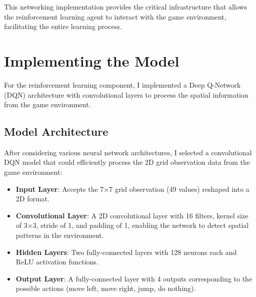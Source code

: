 This networking implementation provides the critical infrastructure that allows the reinforcement learning agent to interact with the game environment, facilitating the entire learning process.

\section{Implementing the Model}

For the reinforcement learning component, I implemented a Deep Q-Network (DQN) architecture with convolutional layers to process the spatial information from the game environment.

\subsection{Model Architecture}

After considering various neural network architectures, I selected a convolutional DQN model that could efficiently process the 2D grid observation data from the game environment:

\begin{itemize}
    \item \textbf{Input Layer}: Accepts the 7×7 grid observation (49 values) reshaped into a 2D format.
    \item \textbf{Convolutional Layer}: A 2D convolutional layer with 16 filters, kernel size of 3×3, stride of 1, and padding of 1, enabling the network to detect spatial patterns in the environment.
    \item \textbf{Hidden Layers}: Two fully-connected layers with 128 neurons each and ReLU activation functions.
    \item \textbf{Output Layer}: A fully-connected layer with 4 outputs corresponding to the possible actions (move left, move right, jump, do nothing).
\end{itemize}

